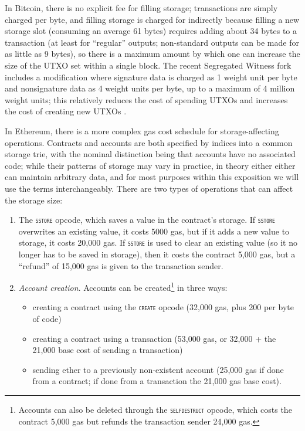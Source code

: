 \documentclass[12pt, final]{article}
\newcommand{\opcode}[1]{\textsc{\texttt{#1}}}
\begin{document}
In Bitcoin, there is no explicit fee for filling storage; transactions are simply charged per byte, and filling storage is charged for indirectly because filling a new storage slot (consuming an average 61 bytes\cite{utxo1}) requires adding about 34 bytes\cite{utxo2} to a transaction (at least for ``regular'' outputs; non-standard outputs can be made for as little as 9 bytes\cite{utxo3}\cite{utxo4}), so there is a maximum amount by which one can increase the size of the UTXO set within a single block. The recent Segregated Witness fork includes a modification where signature data is charged as 1 weight unit per byte and nonsignature data as 4 weight units per byte, up to a maximum of 4 million weight units; this relatively reduces the cost of spending UTXOs and increases the cost of creating new UTXOs \cite{segwitwhy4}.

In Ethereum, there is a more complex gas cost schedule for storage-affecting operations. Contracts and accounts are both specified by indices into a common storage trie, with the nominal distinction being that accounts have no associated code; while their patterns of storage may vary in practice, in theory either either can maintain arbitrary data, and for most purposes within this exposition we will use the terms interchangeably. There are two types of operations that can affect the storage size:

\begin{enumerate}
    \item The \opcode{sstore} opcode, which saves a value in the contract's storage. If \opcode{sstore} overwrites an existing value, it costs 5000 gas, but if it adds a new value to storage, it costs 20,000 gas. If \opcode{sstore} is used to clear an existing value (so it no longer has to be saved in storage), then it costs the contract 5,000 gas, but a ``refund'' of 15,000 gas is given to the transaction sender.

    \item \emph{Account creation}. Accounts can be created\footnote{Accounts can also be deleted through the \opcode{selfdestruct} opcode, which costs the contract 5,000 gas but refunds the transaction sender 24,000 gas.} in three ways:

    \begin{itemize}
        \item creating a contract using the \opcode{create} opcode (32,000 gas, plus 200 per byte of code)
        \item creating a contract using a transaction (53,000 gas, or 32,000 + the 21,000 base cost of sending a transaction)
        \item sending ether to a previously non-existent account (25,000 gas if done from a contract; if done from a transaction the 21,000 gas base cost).

    \end{itemize}

\end{enumerate}
\end{document}
